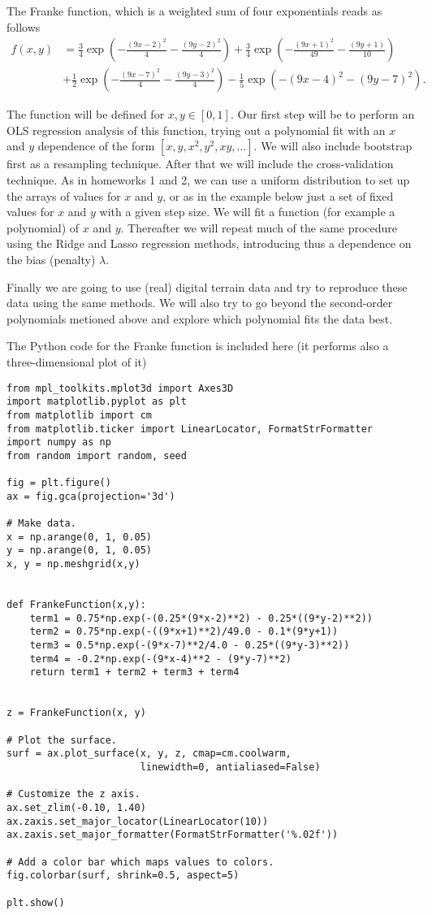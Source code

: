 \documentclass[%
oneside,                 %
final,                   %
10pt]{article}
\begin{document}
The Franke function, which is a weighted sum of four exponentials  reads as follows
\begin{align*}
f(x,y) &= \frac{3}{4}\exp{\left(-\frac{(9x-2)^2}{4} - \frac{(9y-2)^2}{4}\right)}+\frac{3}{4}\exp{\left(-\frac{(9x+1)^2}{49}- \frac{(9y+1)}{10}\right)} \\
&+\frac{1}{2}\exp{\left(-\frac{(9x-7)^2}{4} - \frac{(9y-3)^2}{4}\right)} -\frac{1}{5}\exp{\left(-(9x-4)^2 - (9y-7)^2\right) }.
\end{align*}

The function will be defined for $x,y\in [0,1]$.  Our first step will
be to perform an OLS regression analysis of this function, trying out
a polynomial fit with an $x$ and $y$ dependence of the form $[x, y,
x^2, y^2, xy, \dots]$. We will also include bootstrap first as
a resampling technique.  After that we will include the cross-validation technique. As in homeworks 1 and 2, we can use a uniform
distribution to set up the arrays of values for $x$ and $y$, or as in
the example below just a set of fixed 
values for $x$ and $y$ with a given step
size.  We will fit a
function (for example a polynomial) of $x$ and $y$.  Thereafter we
will repeat much of the same procedure using the Ridge and Lasso
regression methods, introducing thus a dependence on the bias
(penalty) $\lambda$.

Finally we are going to use (real) digital terrain data and try to
reproduce these data using the same methods. We will also try to go
beyond the second-order polynomials metioned above and explore 
which polynomial fits the data best.


The Python code for the Franke function is included here (it performs also a three-dimensional plot of it)
\begin{verbatim}
from mpl_toolkits.mplot3d import Axes3D
import matplotlib.pyplot as plt
from matplotlib import cm
from matplotlib.ticker import LinearLocator, FormatStrFormatter
import numpy as np
from random import random, seed

fig = plt.figure()
ax = fig.gca(projection='3d')

# Make data.
x = np.arange(0, 1, 0.05)
y = np.arange(0, 1, 0.05)
x, y = np.meshgrid(x,y)


def FrankeFunction(x,y):
    term1 = 0.75*np.exp(-(0.25*(9*x-2)**2) - 0.25*((9*y-2)**2))
    term2 = 0.75*np.exp(-((9*x+1)**2)/49.0 - 0.1*(9*y+1))
    term3 = 0.5*np.exp(-(9*x-7)**2/4.0 - 0.25*((9*y-3)**2))
    term4 = -0.2*np.exp(-(9*x-4)**2 - (9*y-7)**2)
    return term1 + term2 + term3 + term4


z = FrankeFunction(x, y)

# Plot the surface.
surf = ax.plot_surface(x, y, z, cmap=cm.coolwarm,
                       linewidth=0, antialiased=False)

# Customize the z axis.
ax.set_zlim(-0.10, 1.40)
ax.zaxis.set_major_locator(LinearLocator(10))
ax.zaxis.set_major_formatter(FormatStrFormatter('%.02f'))

# Add a color bar which maps values to colors.
fig.colorbar(surf, shrink=0.5, aspect=5)

plt.show()

\end{verbatim}
\end{document}
